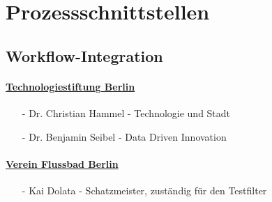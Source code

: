 \section{Prozessschnittstellen}


\subsection{Workflow-Integration}


\paragraph{\uline{Technologiestiftung Berlin}}
\begin{itemize}
\item[-] Dr. Christian Hammel - Technologie und Stadt
\item[-] Dr. Benjamin Seibel  - Data Driven Innovation
\end{itemize}

\paragraph{\uline{Verein Flussbad Berlin}}
\begin{itemize}
\item[-] Kai Dolata - Schatzmeister, zuständig für den Testfilter
\end{itemize}